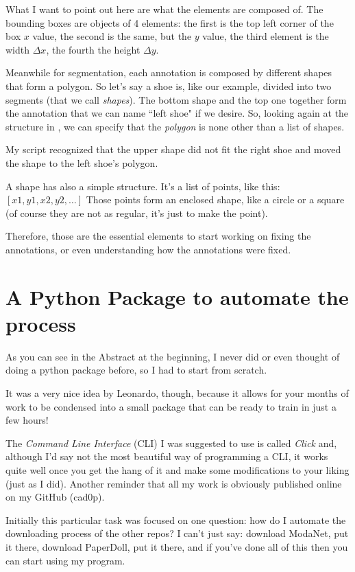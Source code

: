 What I want to point out here are what the elements are composed of. The bounding boxes are objects of 4 elements: the first is the top left corner of the box $x$ value, the second is the same, but the $y$ value, the third element is the width $\Delta x$, the fourth the height $\Delta y$.

Meanwhile for segmentation, each annotation is composed by different shapes that form a polygon. So let's say a shoe is, like our example, divided into two segments (that we call \emph{shapes}). The bottom shape and the top one together form the annotation that we can name “left shoe" if we desire. So, looking again at the structure in , we can specify that the \emph{polygon} is none other than a list of shapes.

My script recognized that the upper shape did not fit the right shoe and moved the shape to the left shoe's polygon.

A shape has also a simple structure. It's a list of points, like this: $[x1, y1, x2, y2,\dots]$
Those points form an enclosed shape, like a circle or a square (of course they are not as regular, it's just to make the point).

Therefore, those are the essential elements to start working on fixing the annotations, or even understanding how the annotations were fixed.

\section{A Python Package to automate the process}\label{s:ds-package}

As you can see in the Abstract at the beginning, I never did or even thought of doing a python package before, so I had to start from scratch. 

It was a very nice idea by Leonardo, though, because it allows for your months of work to be condensed into a small package that can be ready to train in just a few hours!

The \emph{Command Line Interface} (CLI) I was suggested to use is called \emph{Click} and, although I'd say not the most beautiful way of programming a CLI, it works quite well once you get the hang of it and make some modifications to your liking (just as I did). Another reminder that all my work is obviously published online on my GitHub (cad0p).

Initially this particular task was focused on one question: how do I automate the downloading process of the other repos? I can't just say: download ModaNet, put it there, download PaperDoll, put it there, and if you've done all of this then you can start using my program.

